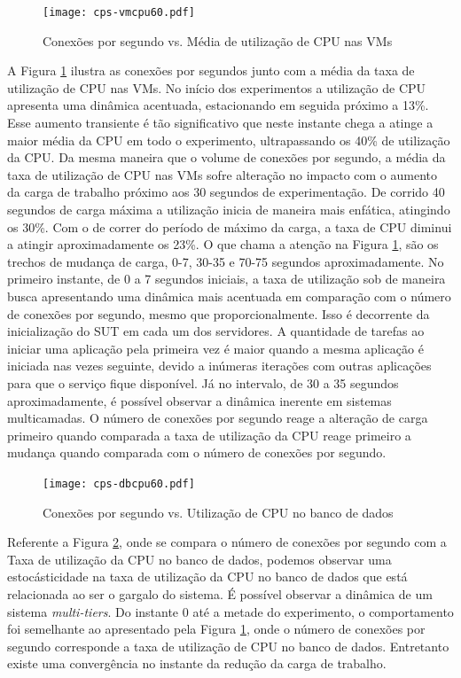 \begin{figure}[htb]
	\centering
	\texttt{[image: cps-vmcpu60.pdf]}
	\caption{Conexões por segundo vs. Média de utilização de CPU nas VMs}
	\label{fig:cps-vmcpu60}
	\fdadospesquisa
\end{figure}

A Figura \ref{fig:cps-vmcpu60} ilustra as conexões por segundos junto com a média da taxa de utilização de CPU nas VMs. No início dos experimentos a utilização de CPU apresenta uma dinâmica acentuada, estacionando em seguida próximo a 13\%. Esse aumento transiente é tão significativo que neste instante chega a atinge a maior média da CPU em todo o experimento, ultrapassando os 40\% de utilização da CPU. Da mesma maneira que o volume de conexões por segundo, a média da taxa de utilização de CPU nas VMs sofre alteração no impacto com o aumento da carga de trabalho próximo aos 30 segundos de experimentação. De corrido 40 segundos de carga máxima a utilização inicia de maneira mais enfática, atingindo os 30\%. Com o de correr do período de máximo da carga, a taxa de CPU diminui a atingir aproximadamente os 23\%. O que chama a atenção na Figura \ref{fig:cps-vmcpu60}, são os trechos de mudança de carga, 0-7, 30-35 e 70-75 segundos aproximadamente. No primeiro instante, de 0 a 7 segundos iniciais, a taxa de utilização sob de maneira busca apresentando uma dinâmica mais acentuada em comparação com o número de conexões por segundo, mesmo que proporcionalmente. Isso é decorrente da inicialização do SUT em cada um dos servidores. A quantidade de tarefas ao iniciar uma aplicação pela primeira vez é maior quando a mesma aplicação é iniciada nas vezes seguinte, devido a inúmeras iterações com outras aplicações para que o serviço fique disponível. Já no intervalo, de 30 a 35 segundos aproximadamente, é possível observar a dinâmica inerente em sistemas multicamadas. O número de conexões por segundo reage a alteração de carga primeiro quando comparada a taxa de utilização da CPU reage primeiro a mudança quando comparada com o número de conexões por segundo.

\begin{figure}[htb]
	\centering
	\texttt{[image: cps-dbcpu60.pdf]}
	\caption{Conexões por segundo vs. Utilização de CPU no banco de dados}
	\label{fig:cps-dbcpu60}
	\fdadospesquisa
\end{figure}

Referente a Figura \ref{fig:cps-dbcpu60}, onde se compara o número de conexões por segundo com a Taxa de utilização da CPU no banco de dados, podemos observar uma estocásticidade na taxa de utilização da CPU no banco de dados que está relacionada ao ser o gargalo do sistema. É possível observar a dinâmica de um sistema \textit{multi-tiers}. Do instante 0 até a metade do experimento, o comportamento foi semelhante ao apresentado pela Figura \ref{fig:cps-vmcpu60}, onde o número de conexões por segundo corresponde a taxa de utilização de CPU no banco de dados. Entretanto existe uma convergência no instante da redução da carga de trabalho. %

